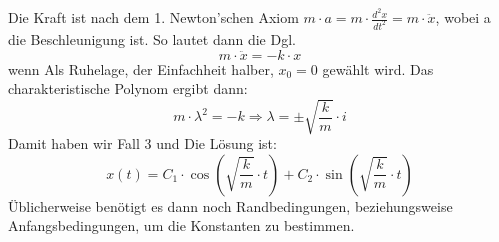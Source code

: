 \documentclass[
	11pt, %
]{beamer}
\begin{document}
\begin{frame}
	\begin{exampleblock}{}
		Die Kraft ist nach dem 1. Newton'schen Axiom $m\cdot a = m\cdot\frac{d^2x}{dt^2}=m\cdot \ddot{x}$, wobei a die Beschleunigung ist. So lautet dann die Dgl.
		\begin{equation}
			m\cdot \ddot{x} = -k\cdot x
		\end{equation}
		wenn Als Ruhelage, der Einfachheit halber, $x_0=0$ gew\"ahlt wird. Das charakteristische Polynom ergibt dann:
		\begin{equation}
			m\cdot\lambda^2 = -k \Rightarrow \lambda = \pm \sqrt{\frac{k}{m}}\cdot i
		\end{equation}
		Damit haben wir Fall 3 und Die L\"osung ist:
		\begin{equation}
			x(t) = C_1\cdot \cos\left(\sqrt{\frac{k}{m}}\cdot t\right) + C_2\cdot \sin\left(\sqrt{\frac{k}{m}}\cdot t\right)
		\end{equation}
		\"Ublicherweise ben\"otigt es dann noch Randbedingungen, beziehungsweise Anfangsbedingungen, um die Konstanten zu bestimmen.
	\end{exampleblock}
\end{frame}
\end{document}
